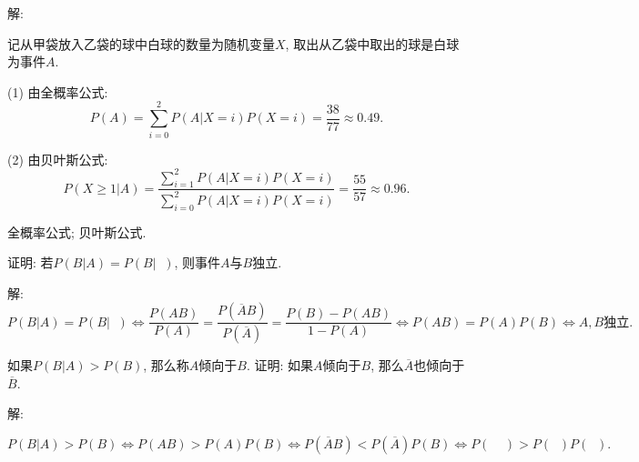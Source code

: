 \documentclass[standard]{ExBook}
\begin{document}
\begin{qitems}
\vspace{-5em}

    \begin{bbox}
解:

记从甲袋放入乙袋的球中白球的数量为随机变量$X$, 取出从乙袋中取出的球是白球为事件$A$.

(1) 由全概率公式:
$$P(A)=\sum\limits_{i=0}^{2}P(A|X=i)P(X=i)=\frac{38}{77}\approx0.49.$$

(2) 由贝叶斯公式:
$$P(X\geq1|A)=\frac{\sum\limits_{i=1}^{2}P(A|X=i)P(X=i)}{\sum\limits_{i=0}^{2}P(A|X=i)P(X=i)}=\frac{55}{57}\approx0.96.$$

\textcolor{themeColor}{\selectfont {} 全概率公式; 贝叶斯公式.}
    \end{bbox}

\vspace{-5em}

    \begin{bbox}
    \begin{shaded}
        \qitem
证明: 若$P(B|A) = P(B|\mathop{\overline{A}})$, 则事件$A$与$B$独立.
    \end{shaded}
    \end{bbox}

\vspace{-5em}

    \begin{bbox}
解:
$$P(B|A) = P(B|\mathop{\overline{A}}) \Longleftrightarrow \frac{P(AB)}{P(A)}=\frac{P(\overline{A}B)}{P(\overline{A})}=\frac{P(B)-P(AB)}{1-P(A)} \Longleftrightarrow P(AB)=P(A)P(B) \Longleftrightarrow A,B\text{独立}.$$
    \end{bbox}

\vspace{-5em}

    \begin{bbox}
    \begin{shaded}
        \qitem
如果$P(B|A) > P(B)$, 那么称$A$倾向于$B$. 证明: 如果$A$倾向于$B$, 那么$\overline{A}$也倾向于$\overline{B}$.
    \end{shaded}
    \end{bbox}

\vspace{-5em}

    \begin{bbox}
解: 

$$P(B|A) > P(B) \Longleftrightarrow P(AB) > P(A)P(B) \Longleftrightarrow P(\overline{A}B) < P(\overline{A})P(B) \Longleftrightarrow P(\mathop{\overline{A}}\mathop{\overline{B}}) > P(\mathop{\overline{A}})P(\mathop{\overline{B}}).$$
    \end{bbox}


\end{qitems}
\end{document}
